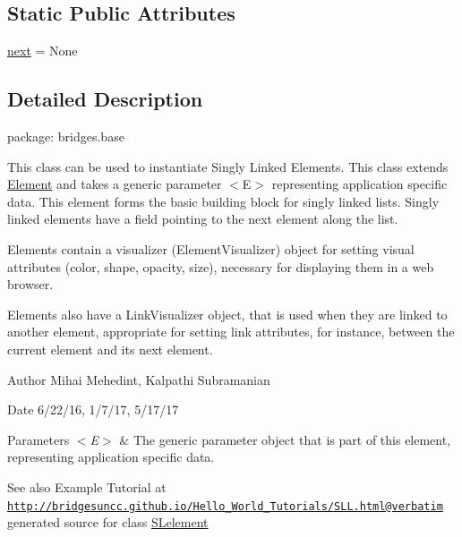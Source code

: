 \subsection*{Static Public Attributes}
\begin{DoxyCompactItemize}
\item 
\hyperlink{class_s_lelement_1_1_s_lelement_a2d83afedba3b70183c90c3454ac99a29}{next} = None
\end{DoxyCompactItemize}


\subsection{Detailed Description}
package\+: bridges.\+base 

This class can be used to instantiate Singly Linked Elements. This class extends \hyperlink{namespace_element}{Element} and takes a generic parameter $<$\+E$>$ representing application specific data. This element forms the basic building block for singly linked lists. Singly linked elements have a field pointing to the next element along the list.

\begin{DoxyVerb}Elements contain a visualizer (ElementVisualizer) object for setting visual
attributes (color, shape, opacity, size), necessary for displaying them in a
web browser.

Elements also have a LinkVisualizer object, that is used when they are linked to
another element, appropriate for setting link attributes, for instance, between
the current element and its next element.
\end{DoxyVerb}


\begin{DoxyAuthor}{Author}
Mihai Mehedint, Kalpathi Subramanian
\end{DoxyAuthor}
\begin{DoxyDate}{Date}
6/22/16, 1/7/17, 5/17/17
\end{DoxyDate}

\begin{DoxyParams}{Parameters}
{\em $<$\+E$>$} & The generic parameter object that is part of this element, representing application specific data.\\
\hline
\end{DoxyParams}
\begin{DoxySeeAlso}{See also}
Example Tutorial at ~\newline
 \href{http://bridgesuncc.github.io/Hello_World_Tutorials/SLL.html@verbatim}{\tt http\+://bridgesuncc.\+github.\+io/\+Hello\+\_\+\+World\+\_\+\+Tutorials/\+S\+L\+L.\+html@verbatim} generated source for class \hyperlink{class_s_lelement_1_1_s_lelement}{S\+Lelement}  
\end{DoxySeeAlso}


